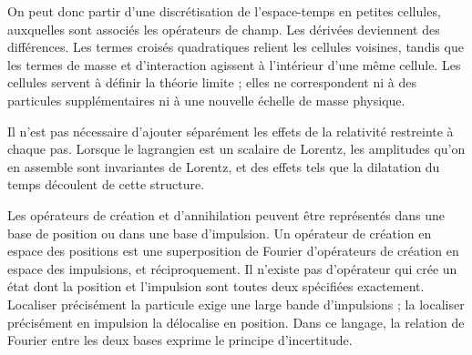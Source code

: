 \begin{classroomqa}
\end{classroomqa}

On peut donc partir d’une discrétisation de l’espace-temps en petites cellules, auxquelles sont associés les opérateurs de champ. Les dérivées deviennent des différences. Les termes croisés quadratiques relient les cellules voisines, tandis que les termes de masse et d’interaction agissent à l’intérieur d’une même cellule. Les cellules servent à définir la théorie limite ; elles ne correspondent ni à des particules supplémentaires ni à une nouvelle échelle de masse physique.

Il n’est pas nécessaire d’ajouter séparément les effets de la relativité restreinte à chaque pas. Lorsque le lagrangien est un scalaire de Lorentz, les amplitudes qu’on en assemble sont invariantes de Lorentz, et des effets tels que la dilatation du temps découlent de cette structure.

\begin{classroomqa}
\end{classroomqa}

Les opérateurs de création et d’annihilation peuvent être représentés dans une base de position ou dans une base d’impulsion. Un opérateur de création en espace des positions est une superposition de Fourier d’opérateurs de création en espace des impulsions, et réciproquement. Il n’existe pas d’opérateur qui crée un état dont la position et l’impulsion sont toutes deux spécifiées exactement. Localiser précisément la particule exige une large bande d’impulsions ; la localiser précisément en impulsion la délocalise en position. Dans ce langage, la relation de Fourier entre les deux bases exprime le principe d’incertitude.

